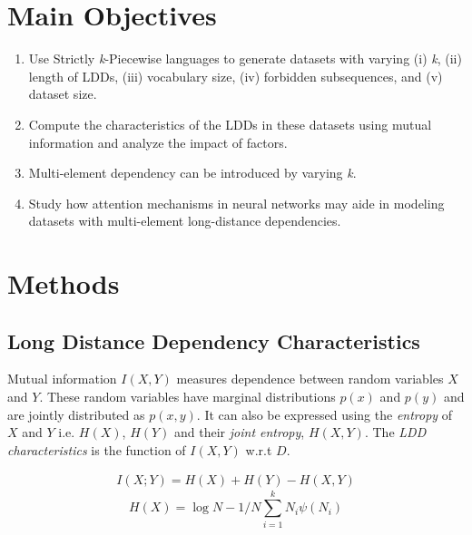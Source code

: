 \documentclass[a0,portrait]{a0poster}
\begin{document}
\begin{multicols}{2}

\section*{Main Objectives}

\begin{enumerate}
\item Use Strictly \emph{k}-Piecewise languages to generate datasets with varying (i) \emph{k}, (ii) length of LDDs, (iii) vocabulary size, (iv) forbidden subsequences, and (v) dataset size.
\item Compute the characteristics of the LDDs in these datasets using mutual information and analyze the impact of factors.
\item Multi-element dependency can be introduced by varying \emph{k}. 
\item Study how attention mechanisms in neural networks may aide in modeling datasets with multi-element long-distance dependencies.
\end{enumerate}


\section*{Methods}

\subsection*{Long Distance Dependency Characteristics}

Mutual information $I(X,Y)$ measures dependence between random variables $X$ and $Y$. These random variables have marginal distributions $p(x)$ and $p(y)$ and are jointly distributed as $p(x,y)$. It can also be expressed using the \emph{entropy} of $X$ and $Y$ i.e. $H(X)$, $H(Y)$ and their \emph{joint entropy}, $H(X,Y)$. The \emph{LDD characteristics} is the function of $I(X,Y)$ w.r.t $D$.

\begin{multicols}{2}
\begin{equation}
\begin{aligned}
I(X;Y) = H(X) + H(Y) - H(X,Y)
\label{eq:mut-inf-h}
\end{aligned}
\end{equation}
\begin{equation}
H(X) = \log N - 1/N \sum_{i=1}^{k} N_i \psi(N_i)
\label{eq:entropy-adj}
\end{equation}


\end{multicols}
\end{multicols}
\end{document}
